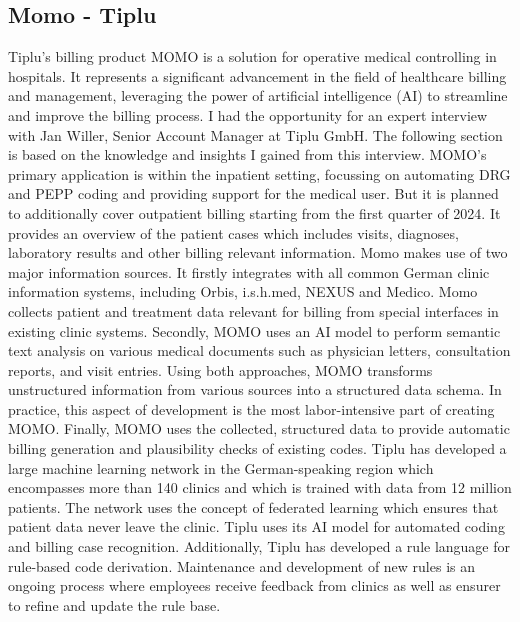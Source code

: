 \subsection{Momo - Tiplu}\label{subsec:momo---tiplu}
Tiplu's billing product MOMO is a solution for operative medical controlling in hospitals.
It represents a significant advancement in the field of healthcare billing and management,
leveraging the power of artificial intelligence (AI) to streamline and improve the billing process.
I had the opportunity for an expert interview with Jan Willer, Senior Account Manager at Tiplu GmbH.
The following section is based on the knowledge and insights I gained from this interview.
MOMO's primary application is within the inpatient setting, focussing on automating DRG and PEPP coding and providing support for the medical user.
But it is planned to additionally cover outpatient billing starting from the first quarter of 2024.
It provides an overview of the patient cases which includes visits, diagnoses, laboratory results and other billing relevant information.
Momo makes use of two major information sources.
It firstly integrates with all common German clinic information systems, including Orbis, i.s.h.med, NEXUS and Medico.
Momo collects patient and treatment data relevant for billing from special interfaces in existing clinic systems.
Secondly, MOMO uses an AI model to perform semantic text analysis on various medical documents such as physician letters, consultation reports, and visit entries.
Using both approaches, MOMO transforms unstructured information from various sources into a structured data schema.
In practice, this aspect of development is the most labor-intensive part of creating MOMO.
Finally, MOMO uses the collected, structured data to provide automatic billing generation and plausibility checks of existing codes.
Tiplu has developed a large machine learning network in the German-speaking region which encompasses more than 140 clinics and which is trained with data from 12 million patients.
The network uses the concept of federated learning which ensures that patient data never leave the clinic.
Tiplu uses its AI model for automated coding and billing case recognition.
Additionally, Tiplu has developed a rule language for rule-based code derivation.
Maintenance and development of new rules is an ongoing process where employees receive feedback from clinics as well as ensurer to refine and update the rule base.

